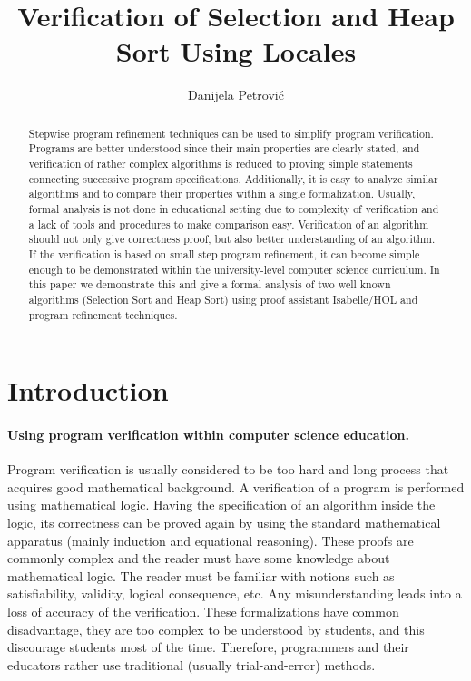 \documentclass[11pt,a4paper]{article}
\begin{document}
\title{ Verification of Selection and Heap Sort Using Locales}
\author{Danijela Petrovi\'c}
\maketitle

\begin{abstract}
  Stepwise program refinement techniques can be used to simplify
  program verification. Programs are better understood since their
  main properties are clearly stated, and verification of rather
  complex algorithms is reduced to proving simple statements
  connecting successive program specifications. Additionally, it is
  easy to analyze similar algorithms and to compare their properties
  within a single formalization. Usually, formal analysis is not done
  in educational setting due to complexity of verification and a lack
  of tools and procedures to make comparison easy. Verification of an
  algorithm should not only give correctness proof, but also better
  understanding of an algorithm. If the verification is based on small
  step program refinement, it can become simple enough to be
  demonstrated within the university-level computer science
  curriculum. In this paper we demonstrate this and give a formal
  analysis of two well known algorithms (Selection Sort and Heap Sort)
  using proof assistant Isabelle/HOL and program refinement
  techniques.
\end{abstract}

\tableofcontents

\section{Introduction}

\paragraph*{Using program verification within computer science
  education.}
Program verification is usually considered to be too hard and long
process that acquires good mathematical background. A verification of
a program is performed using mathematical logic. Having the
specification of an algorithm inside the logic, its correctness can be
proved again by using the standard mathematical apparatus (mainly
induction and equational reasoning). These proofs are commonly complex
and the reader must have some knowledge about mathematical logic. The
reader must be familiar with notions such as satisfiability, validity,
logical consequence, etc. Any misunderstanding leads into a loss of
accuracy of the verification. These formalizations have common
disadvantage, they are too complex to be understood by students, and
this discourage students most of the time. Therefore, programmers and
their educators rather use traditional (usually trial-and-error)
methods.
\end{document}
